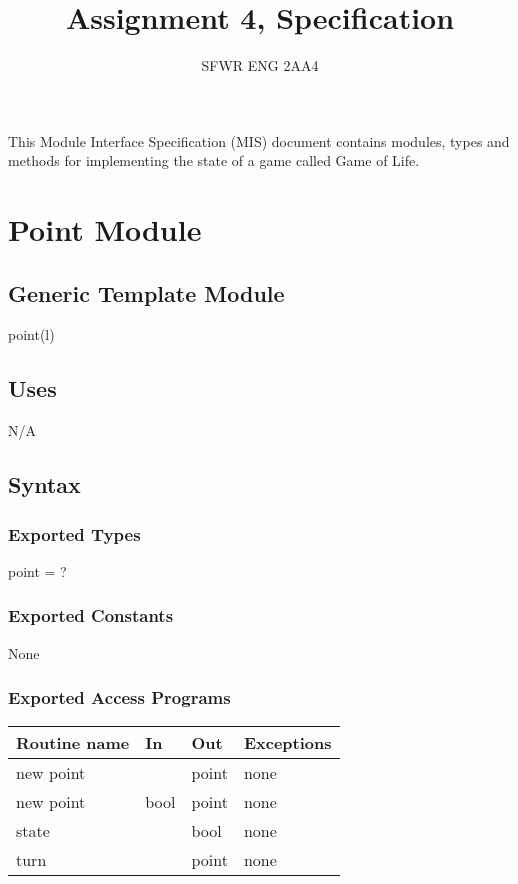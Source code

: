 \documentclass[12pt]{article}
\title{Assignment 4, Specification}
\author{SFWR ENG 2AA4}
\begin{document}
\maketitle
This Module Interface Specification (MIS) document contains modules, types and
methods for implementing the state of a game called Game of Life.


\newpage



\section* {Point Module}

\subsection* {Generic Template Module}

point(l)

\subsection* {Uses}

N/A

\subsection* {Syntax}

\subsubsection* {Exported Types}

point = ?

\subsubsection* {Exported Constants}

None

\subsubsection* {Exported Access Programs}

\begin{tabular}{| l | l | l | p{5cm} |}
\hline
\textbf{Routine name} & \textbf{In} & \textbf{Out} & \textbf{Exceptions}\\
\hline
new point & & point & none\\
\hline
new point & bool & point & none\\
\hline
state &  & bool & none\\
\hline
turn & & point & none\\
\hline

\end{tabular}
\end{document}
